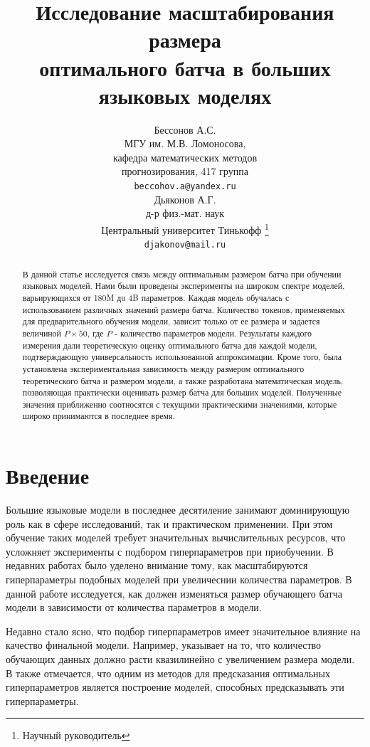 \documentclass{article}
\title{Исследование масштабирования размера \\ оптимального батча в больших языковых моделях}
\author{ Бессонов А.С. \\
	МГУ им. М.В. Ломоносова, \\
	кафедра математических методов \\ прогнозирования, 417 группа\\
	\texttt{beccohov.a@yandex.ru} \\
	\And
        Дьяконов А.Г. \\
	д-р физ.-мат. наук         \\
	Центральный университет Тинькофф \thanks{Научный руководитель} \\
	\texttt{djakonov@mail.ru} \\
}
\date{}
\begin{document}
\maketitle

\begin{abstract}
В данной статье исследуется связь между оптимальным размером батча при обучении языковых моделей. Нами были проведены эксперименты на широком спектре моделей, варьирующихся от 180M до 4B параметров. Каждая модель обучалась с использованием различных значений размера батча. Количество токенов, применяемых для предварительного обучения модели, зависит только от ее размера и задается величиной $P \times 50$, где $P$ - количество параметров модели. Результаты каждого измерения дали теоретическую оценку оптимального батча для каждой модели, подтверждающую универсальность использованной аппроксимации. Кроме того, была установлена экспериментальная зависимость между размером оптимального теоретического батча и размером модели, а также разработана математическая модель, позволяющая практически оценивать размер батча для больших моделей. Полученные значения приближенно соотносятся с текущими практическими значениями, которые широко принимаются в последнее время.
\end{abstract}


\section{Введение}
\quad Большие языковые модели в последнее десятиление занимают доминирующую роль как в сфере исследований, так и практическом применении. При этом обучение таких моделей требует значительных вычислительных ресурсов, что усложняет эксперименты с подбором гиперпараметров при приобучении. В недавних работах было уделено внимание тому, как масштабируются гиперпараметры подобных моделей при увеличеснии количества параметров. В данной работе исследуется, как должен изменяться размер обучающего батча модели в зависимости от количества параметров в модели.

\quad Недавно стало ясно, что подбор гиперпараметров имеет значительное влияние на качество финальной модели. Например, \cite{hoffmann2022training} указывает на то, что количество обучающих данных должно расти квазилинейно с увеличением размера модели. В \cite{OpenAI2023GPT4TR} также отмечается, что одним из методов для предсказания оптимальных гиперпараметров является построение моделей, способных предсказывать эти гиперпараметры.
\end{document}
